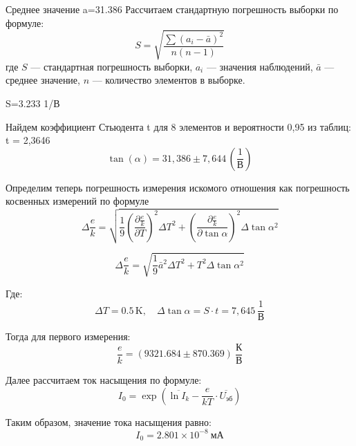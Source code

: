 Среднее значение a=31.386
Рассчитаем стандартную погрешность выборки по формуле:
\[
S = \sqrt{\frac{\sum (a_i - \bar{a})^2}{n(n-1)}}
\]
где \(S\) — стандартная погрешность выборки, \(a_i\) — значения наблюдений, \(\bar{a}\) — среднее значение, \(n\) — количество элементов в выборке.

S=3.233 1/В


Найдем коэффициент Стьюдента t для 8 элементов и вероятности 0,95 из таблиц: t = 2,3646
\[
\tan(\alpha) = 31,386 \pm 7,644 \, \left(\frac{1}{\text{В}}\right)
\]

Определим теперь погрешность измерения искомого отношения как погрешность косвенных измерений по формуле
\[
\Delta \frac{e}{k} = \sqrt{\frac{1}{9} \left( \frac{\partial \frac{e}{k}}{\partial T} \right)^2 \Delta T^2 + \left( \frac{\partial \frac{e}{k}}{\partial \tan \alpha} \right)^2 \Delta \tan \alpha^2 }
\]

\[
\Delta \frac{e}{k} = \sqrt{\frac{1}{9} \bar{a}^2 \Delta T^2 + T^2 \Delta \tan \alpha^2} \tag{4}
\]

Где:
\[
\Delta T = 0.5 \, \text{K}, \quad \Delta \tan \alpha = S \cdot t = 7,645 \, \frac{1}{\text{В}}
\]

Тогда для первого измерения:
\[
\frac{e}{k} = (9321.684 \pm 870.369)~\frac{\text{К}}{\text{В}}
\]

Далее рассчитаем ток насыщения по формуле:
\[
I_0 = \exp\left( \overline{\ln I_k} - \frac{e}{kT} \cdot \overline{U_{\text{эб}}} \right)
\]


Таким образом, значение тока насыщения равно:
\[
I_0 = 2.801 \times 10^{-8}~\text{мА}
\]





